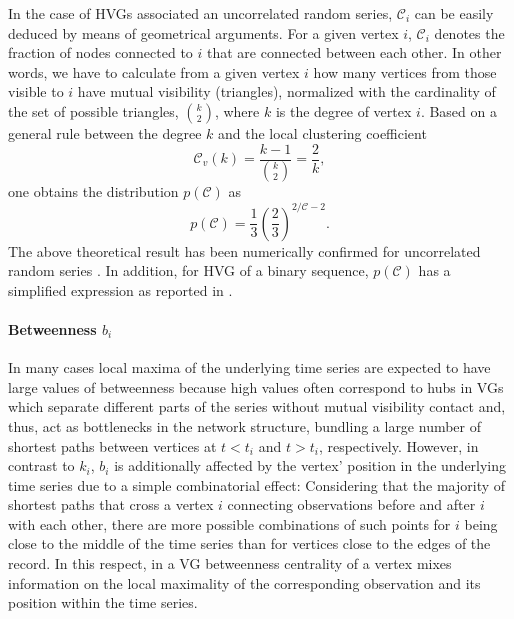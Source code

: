 		In the case of HVGs associated an uncorrelated random series, $\mathcal{C}_i$ can be easily deduced by means of geometrical arguments. For a given vertex $i$, $\mathcal{C}_i$ denotes the fraction of nodes connected to $i$ that are connected between each other. In other words, we have to calculate from a given vertex $i$ how many vertices from those visible to $i$ have mutual visibility (triangles), normalized with the cardinality of the set of possible triangles, $\binom{k}{2}$, where $k$ is the degree of vertex $i$. Based on a general rule between the degree $k$ and the local clustering coefficient
		\begin{equation}
		\mathcal{C}_v(k) = \frac{k-1}{\binom{k}{2}} = \frac{2}{k}, 
		\end{equation}
one obtains the distribution $p(\mathcal{C})$ as 
		\begin{equation}
		p(\mathcal{C}) = \frac{1}{3} \left(\frac{2}{3}\right)^{2/\mathcal{C} -2}. 
		\end{equation}
The above theoretical result has been numerically confirmed for uncorrelated random series \cite{Luque2009}. In addition, for HVG of a binary sequence, $p(\mathcal{C})$ has a simplified expression as reported in \cite{Ahadpour2012}. 
			
		\paragraph{Betweenness $b_i$}
		In many cases local maxima of the underlying time series are expected to have large values of betweenness because high values often correspond to hubs in VGs which separate different parts of the series without mutual visibility contact and, thus, act as bottlenecks in the network structure, bundling a large number of shortest paths between vertices at $t < t_i$ and $t > t_i$, respectively. However, in contrast to $k_i$, $b_i$ is additionally affected by the vertex' position in the underlying time series due to a simple combinatorial effect: Considering that the majority of shortest paths that cross a vertex $i$ connecting observations before and after $i$ with each other, there are more possible combinations of such points for $i$ being close to the middle of the time series than for vertices close to the edges of the record. In this respect, in a VG betweenness centrality of a vertex mixes information on the local maximality of the corresponding observation and its position within the time series.
		
